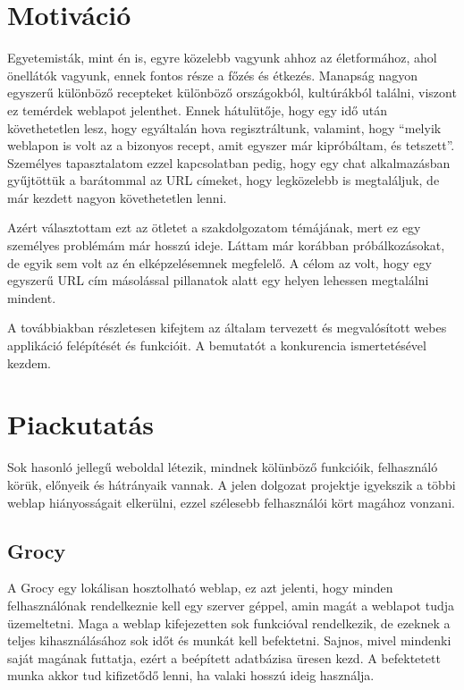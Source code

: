 \documentclass[12pt]{report}
\theoremstyle{definition}
\begin{document}
\chapter*{Motiváció}
Egyetemisták, mint én is, egyre közelebb vagyunk ahhoz az életformához, ahol önellátók vagyunk, ennek fontos része a főzés és étkezés. Manapság nagyon egyszerű különböző recepteket különböző országokból, kultúrákból találni, viszont ez temérdek weblapot jelenthet. Ennek hátulütője, hogy egy idő után követhetetlen lesz, hogy egyáltalán hova regisztráltunk, valamint, hogy “melyik weblapon is volt az a bizonyos recept, amit egyszer már kipróbáltam, és tetszett”. Személyes tapasztalatom ezzel kapcsolatban pedig, hogy egy chat alkalmazásban gyűjtöttük a barátommal az URL címeket, hogy legközelebb is megtaláljuk, de már kezdett nagyon követhetetlen lenni.

Azért választottam ezt az ötletet a szakdolgozatom témájának, mert ez egy személyes problémám már hosszú ideje. Láttam már korábban próbálkozásokat, de egyik sem volt az én elképzelésemnek megfelelő. A célom az volt, hogy egy egyszerű URL cím másolással pillanatok alatt egy helyen lehessen megtalálni mindent. 

A továbbiakban részletesen kifejtem az általam tervezett és megvalósított webes applikáció felépítését és funkcióit. A bemutatót a konkurencia ismertetésével kezdem.



\chapter{Piackutatás}
Sok hasonló jellegű weboldal létezik, mindnek kölünböző funkcióik, felhasználó körük, előnyeik és hátrányaik vannak. A jelen dolgozat projektje igyekszik a többi weblap hiányosságait elkerülni, ezzel szélesebb felhasználói kört magához vonzani.


\section{Grocy}
A Grocy egy lokálisan hosztolható weblap, ez azt jelenti, hogy minden felhasználónak rendelkeznie kell egy szerver géppel, amin magát a weblapot tudja üzemeltetni. Maga a weblap kifejezetten sok funkcióval rendelkezik, de ezeknek a teljes kihasználásához sok időt és munkát kell befektetni. Sajnos, mivel mindenki saját magának futtatja, ezért a beépített adatbázisa üresen kezd. A befektetett munka akkor tud kifizetődő lenni, ha valaki hosszú ideig használja.
\end{document}
